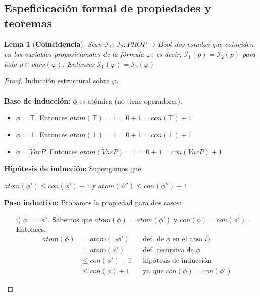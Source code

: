 \documentclass[letterpaper,11pt]{article}
\begin{document}
    \subsection{Espeficicación formal de propiedades y teoremas}
    \newtheorem{theorem}{Lema}
    \begin{theorem} [\textbf{Coincidencia}]
        Sean $\mathcal{I}_{1}$, $\mathcal{I}_{2} : PROP \rightarrow Bool$ dos
        estados que coinciden en las variables proposicionales de la fórmula 
        $\varphi$, es decir, $\mathcal{I}_{1}(p) = \mathcal{I}_{2}(p)$ para 
        toda $p \in vars(\varphi)$. Entonces 
        $\mathcal{I}_{1}(\varphi) = \mathcal{I}_{2}(\varphi)$
    \end{theorem}
    \begin{proof}
        Inducción estructural sobre $\varphi$. \\\\
        \textbf{Base de inducción:} $\phi$ es atómica (no tiene operadores). 
        \begin{itemize}
            \item $\phi = \top$. Entonces 
            $atom(\top)= 1 = 0 + 1 = con(\top) + 1$
            \item $\phi = \bot$. Entonces 
            $atom(\bot)= 1 = 0 + 1 = con(\bot) + 1$
            \item $\phi = Var P$. Entonces 
            $atom(Var P) = 1 = 0 + 1 = con(Var P) + 1$
        \end{itemize}

        \textbf{Hipótesis de inducción:} Supongamos que 
        \begin{center}
            $atom(\phi') \leq con(\phi') + 1$ y $atom(\phi'') \leq con(\phi'') + 1$
        \end{center}

        \textbf{Paso inductivo:} Probamos la propiedad para dos casos:
        \begin{itemize}
            \item[i)] $\phi = \neg \phi'$. Sabemos que  
            $atom(\phi) = atom(\phi')$ y $con(\phi) = con(\phi')$. Entonces, 
            \begin{align*}
                atom(\phi) &= atom(\neg \phi')
                           && \text{def. de $\phi$ en el caso $i$)} \\
                           &= atom(\phi')
                           && \text{def. recursiva de $\phi$} \\
                           &\leq con(\phi') + 1
                           && \text{hipótesis de inducción} \\
                           &\leq con(\phi) + 1
                           && \text{ya que $con(\phi) = con(\phi')$}
            \end{align*} 


\end{itemize}
\end{proof}
\end{document}
